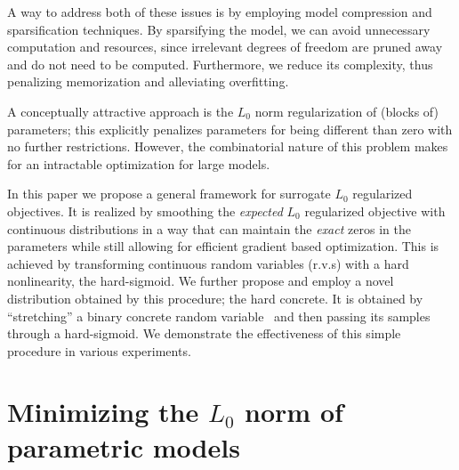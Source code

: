 \documentclass{article} %
\begin{document}
A way to address both of these issues is by employing model compression and sparsification techniques. By sparsifying the model, we can avoid unnecessary computation and resources, since irrelevant degrees of freedom are pruned away and do not need to be computed. Furthermore, we reduce its complexity, thus penalizing memorization and alleviating overfitting. 

A conceptually attractive approach is the $L_0$ norm regularization of (blocks of) parameters; this explicitly penalizes parameters for being different than zero with no further restrictions. However, the combinatorial nature of this problem makes for an intractable optimization for large models. 

In this paper we propose a general framework for surrogate $L_0$ regularized objectives. It is realized by smoothing the \emph{expected} $L_0$ regularized objective with continuous distributions in a way that can maintain the \emph{exact} zeros in the parameters while still allowing for efficient gradient based optimization. This is achieved by transforming continuous random variables (r.v.s) with a hard nonlinearity, the hard-sigmoid. We further propose and employ a novel distribution obtained by this procedure; the hard concrete. It is obtained by ``stretching'' a binary concrete random variable~\citep{maddison2016concrete,jang2016categorical} and then passing its samples through a hard-sigmoid. We demonstrate the effectiveness of this simple procedure in various experiments.

\section{Minimizing the $L_0$ norm of parametric models}
\end{document}
